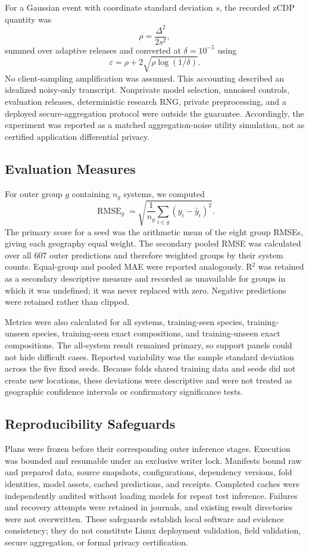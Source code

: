 \documentclass[journal]{IEEEtran}
\begin{document}
For a Gaussian event with coordinate standard deviation $s$, the recorded zCDP
quantity was
\[
  \rho = \frac{\Delta^2}{2s^2},
\]
summed over adaptive releases and converted at $\delta = 10^{-5}$ using
\[
  \varepsilon = \rho + 2\sqrt{\rho \log(1/\delta)}.
\]
No client-sampling amplification was assumed. This accounting described an
idealized noisy-only transcript. Nonprivate model selection, unnoised controls,
evaluation releases, deterministic research RNG, private preprocessing, and a
deployed secure-aggregation protocol were outside the guarantee. Accordingly,
the experiment was reported as a matched aggregation-noise utility simulation,
not as certified application differential privacy.

\subsection{Evaluation Measures}

For outer group $g$ containing $n_g$ systems, we computed
\[
  \operatorname{RMSE}_g = \sqrt{\frac{1}{n_g} \sum_{i \in g}(y_i - \hat{y}_i)^2}.
\]
The primary score for a seed was the arithmetic mean of the eight group RMSEs,
giving each geography equal weight. The secondary pooled RMSE was calculated
over all 607 outer predictions and therefore weighted groups by their system
counts. Equal-group and pooled MAE were reported analogously. R$^2$ was retained
as a secondary descriptive measure and recorded as unavailable for groups in
which it was undefined; it was never replaced with zero. Negative predictions
were retained rather than clipped.

Metrics were also calculated for all systems, training-seen species, training-
unseen species, training-seen exact compositions, and training-unseen exact
compositions. The all-system result remained primary, so support panels could
not hide difficult cases. Reported variability was the sample standard deviation
across the five fixed seeds. Because folds shared training data and seeds did
not create new locations, these deviations were descriptive and were not treated
as geographic confidence intervals or confirmatory significance tests.

\subsection{Reproducibility Safeguards}

Plans were frozen before their corresponding outer inference stages. Execution
was bounded and resumable under an exclusive writer lock. Manifests bound raw
and prepared data, source snapshots, configurations, dependency versions, fold
identities, model assets, cached predictions, and receipts. Completed caches
were independently audited without loading models for repeat test inference.
Failures and recovery attempts were retained in journals, and existing result
directories were not overwritten. These safeguards establish local software and
evidence consistency; they do not constitute Linux deployment validation, field
validation, secure aggregation, or formal privacy certification.
\end{document}
